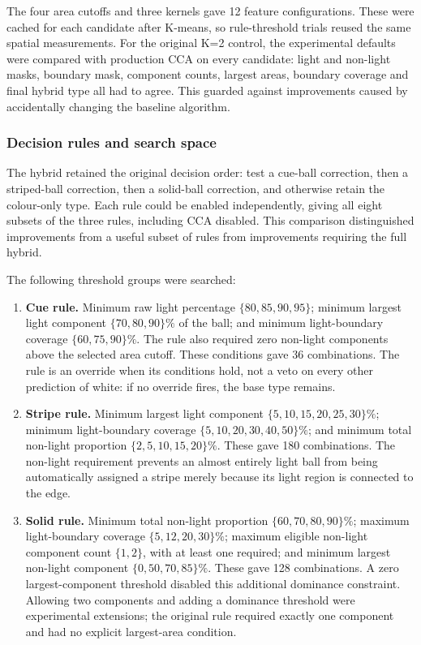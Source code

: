 The four area cutoffs and three kernels gave 12 feature configurations.
These were cached for each candidate after K-means, so rule-threshold trials
reused the same spatial measurements. For the original K=2 control, the
experimental defaults were compared with production CCA on every candidate:
light and non-light masks, boundary mask, component counts, largest areas,
boundary coverage and final hybrid type all had to agree. This guarded
against improvements caused by accidentally changing the baseline algorithm.

\subsubsection{Decision rules and search space}

The hybrid retained the original decision order: test a cue-ball correction,
then a striped-ball correction, then a solid-ball correction, and otherwise
retain the colour-only type. Each rule could be enabled independently,
giving all eight subsets of the three rules, including CCA disabled.
This comparison distinguished improvements from a useful subset of rules
from improvements requiring the full hybrid.

The following threshold groups were searched:

\begin{enumerate}
\item \textbf{Cue rule.} Minimum raw light percentage
$\{80,85,90,95\}$; minimum largest light component
$\{70,80,90\}\%$ of the ball; and minimum light-boundary coverage
$\{60,75,90\}\%$. The rule also required zero non-light components
above the selected area cutoff. These conditions gave 36 combinations.
The rule is an override when its conditions hold, not a veto on every
other prediction of white: if no override fires, the base type remains.
\item \textbf{Stripe rule.} Minimum largest light component
$\{5,10,15,20,25,30\}\%$; minimum light-boundary coverage
$\{5,10,20,30,40,50\}\%$; and minimum total non-light proportion
$\{2,5,10,15,20\}\%$. These gave 180 combinations. The non-light
requirement prevents an almost entirely light ball from being automatically
assigned a stripe merely because its light region is connected to the edge.
\item \textbf{Solid rule.} Minimum total non-light proportion
$\{60,70,80,90\}\%$; maximum light-boundary coverage
$\{5,12,20,30\}\%$; maximum eligible non-light component count
$\{1,2\}$, with at least one required; and minimum largest non-light
component $\{0,50,70,85\}\%$. These gave 128 combinations.
A zero largest-component threshold disabled this additional dominance
constraint. Allowing two components and adding a dominance threshold were
experimental extensions; the original rule required exactly one component
and had no explicit largest-area condition.
\end{enumerate}


